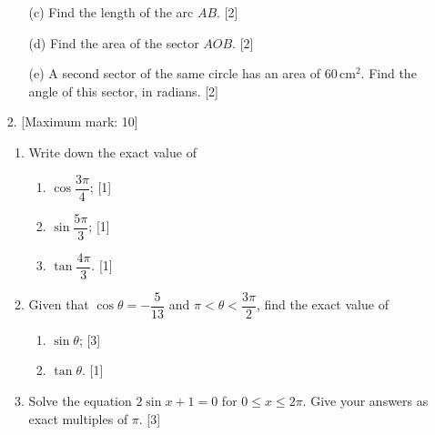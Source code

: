 \documentclass[12pt, twoside]{article}
\begin{document}
\begin{enumerate}[itemsep=0.15cm]
\begin{enumerate}[itemsep=0.1cm]
  \item[(c)] Find the length of the arc $AB$. \hfill [2]
  \item[(d)] Find the area of the sector $AOB$. \hfill [2]
  \item[(e)] A second sector of the same circle has an area of
  $60\,\text{cm}^{2}$. Find the angle of this sector, in radians.
  \hfill [2]
\end{enumerate}


\newpage

\item[2.] [Maximum mark: 10]

\begin{enumerate}[itemsep=0.1cm]
  \item Write down the exact value of
  \begin{enumerate}[label=(\roman*), itemsep=0.05cm]
    \item $\cos\dfrac{3\pi}{4}$; \hfill [1]
    \item $\sin\dfrac{5\pi}{3}$; \hfill [1]
    \item $\tan\dfrac{4\pi}{3}$. \hfill [1]
  \end{enumerate}
  \item Given that $\cos\theta = -\dfrac{5}{13}$ and
  $\pi < \theta < \dfrac{3\pi}{2}$, find the exact value of
  \begin{enumerate}[label=(\roman*), itemsep=0.05cm]
    \item $\sin\theta$; \hfill [3]
    \item $\tan\theta$. \hfill [1]
  \end{enumerate}
  \item Solve the equation $2\sin x + 1 = 0$ for $0 \le x \le 2\pi$.
  Give your answers as exact multiples of $\pi$. \hfill [3]
\end{enumerate}



\end{enumerate}
\end{document}
